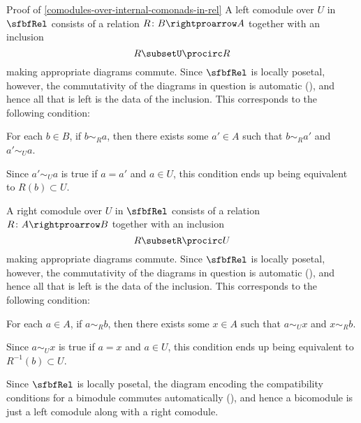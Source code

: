 \begin{Proof}{Proof of \cref{comodules-over-internal-comonads-in-rel}}%
    A left comodule over $U$ in $\sfbfRel$ consists of a relation $R\colon B\rightproarrow A$ together with an inclusion
    \[
        R
        \subset%
        U\procirc R%
    \]%
    making appropriate diagrams commute. Since $\sfbfRel$ is locally posetal, however, the commutativity of the diagrams in question is automatic (), and hence all that is left is the data of the inclusion. This corresponds to the following condition:
    \begin{itemize}
        \itemstar For each $b\in B$, if $b\sim_{R}a$, then there exists some $a'\in A$ such that $b\sim_{R}a'$ and $a'\sim_{U}a$.
    \end{itemize}
    Since $a'\sim_{U}a$ is true if $a=a'$ and $a\in U$, this condition ends up being equivalent to $R(b)\subset U$.

    A right comodule over $U$ in $\sfbfRel$ consists of a relation $R\colon A\rightproarrow B$ together with an inclusion
    \[
        R
        \subset%
        R\procirc U%
    \]%
    making appropriate diagrams commute. Since $\sfbfRel$ is locally posetal, however, the commutativity of the diagrams in question is automatic (), and hence all that is left is the data of the inclusion. This corresponds to the following condition:
    \begin{itemize}
        \itemstar For each $a\in A$, if $a\sim_{R}b$, then there exists some $x\in A$ such that $a\sim_{U}x$ and $x\sim_{R}b$.
    \end{itemize}
    Since $a\sim_{U}x$ is true if $a=x$ and $a\in U$, this condition ends up being equivalent to $R^{-1}(b)\subset U$.

    Since $\sfbfRel$ is locally posetal, the diagram encoding the compatibility conditions for a bimodule commutes automatically (), and hence a bicomodule is just a left comodule along with a right comodule.
\end{Proof}
